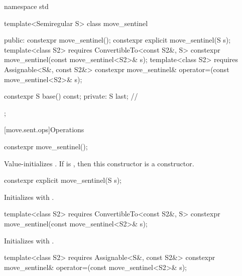%
\begin{codeblock}
namespace std {
  template<Semiregular S>
  class move_sentinel {
  public:
    constexpr move_sentinel();
    constexpr explicit move_sentinel(S s);
    template<class S2>
      requires ConvertibleTo<const S2&, S>
        constexpr move_sentinel(const move_sentinel<S2>& s);
    template<class S2>
      requires Assignable<S&, const S2&>
        constexpr move_sentinel& operator=(const move_sentinel<S2>& s);

    constexpr S base() const;
  private:
    S last;     // \expos
  };
}
\end{codeblock}

[move.sent.ops]{Operations}

%
\begin{itemdecl}
constexpr move_sentinel();
\end{itemdecl}

\begin{itemdescr}
\pnum
\effects Value-initializes .
If  is ,
then this constructor is a  constructor.
\end{itemdescr}

%
\begin{itemdecl}
constexpr explicit move_sentinel(S s);
\end{itemdecl}

\begin{itemdescr}
\pnum
\effects Initializes  with .
\end{itemdescr}

%
\begin{itemdecl}
template<class S2>
  requires ConvertibleTo<const S2&, S>
    constexpr move_sentinel(const move_sentinel<S2>& s);
\end{itemdecl}

\begin{itemdescr}
\pnum
\effects Initializes  with .
\end{itemdescr}

%
%
\begin{itemdecl}
template<class S2>
  requires Assignable<S&, const S2&>
    constexpr move_sentinel& operator=(const move_sentinel<S2>& s);
\end{itemdecl}

